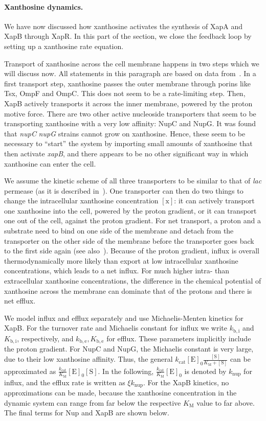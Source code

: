 \documentclass[10pt,letterpaper]{article}
\newcommand{\n}[1]{\mathrm{#1}}
\begin{document}
\paragraph*{Xanthosine dynamics.}
We have now discussed how xanthosine activates the synthesis of XapA and
XapB through XapR. In this part of the section, we close the feedback loop
by setting up a xanthosine rate equation. 

Transport of xanthosine across the cell membrane happens in two steps which
we will discuss now. All statements in this paragraph are based on data
from~\cite{Norholm2001}. In a first transport step, xanthosine passes the
outer membrane through porins like Tsx, OmpF and OmpC. This does not seem to
be a rate-limiting step. Then, XapB actively transports it across the inner
membrane, powered by the proton motive force. There are two other active
nucleoside transporters that seem to be transporting xanthosine with a very
low affinity: NupC and NupG. It was found that \textDelta\emph{nupC}
\textDelta\emph{nupG} strains cannot grow on xanthosine. Hence, these seem
to be necessary to ``start'' the system by importing small amounts of
xanthosine that then activate \emph{xapB}, and there appears to be no other
significant way in which xanthosine can enter the cell.

We assume the kinetic scheme of all three transporters to be similar to that
of \emph{lac} permease (as it is described in~\cite{Kaback2015}). One
transporter can then do two things to change the intracellular xanthosine
concentration $\n{[x]}$: it can actively transport one xanthosine into the
cell, powered by the proton gradient, or it can transport one out of the
cell, against the proton gradient. For net transport, a proton and a
substrate need to bind on one side of the membrane and detach from the
transporter on the other side of the membrane before the transporter goes
back to the first side again (see also~). Because of the
proton gradient, influx is overall thermodynamically more likely than export
at low intracellular xanthosine concentrations, which leads to a net influx.
For much higher intra- than extracellular xanthosine concentrations, the
difference in the chemical potential of xanthosine across the membrane can
dominate that of the protons and there is net efflux. 

We model influx and efflux separately and use Michaelis-Menten kinetics for
XapB. For the turnover rate and Michaelis constant for influx we write
$k_{\n{b, i}}$ and $K_{\n{b, i}}$, respectively, and $k_{\n{b, e}}, K_{\n{b,
e}}$ for efflux. These parameters implicitly include the proton gradient.
For NupC and NupG, the Michaelis constant is very large, due to their low
xanthosine affinity. Thus, the general $k_{\n{cat}} \n{[E]_0}
\frac{\n{[S]}}{K_{\n{M}} + \n{[S]}}$ can be approximated as
$\frac{k_{\n{cat}}}{K_{\n{M}}} \n{[E]_0} \n{[S]}$. In the following,
$\frac{k_{\n{cat}}}{K_{\n{M}}} \n{[E]_0}$ is denoted by $k_{\n{nup}}$ for
influx, and the efflux rate is written as $\xi k_{\n{nup}}$. For the XapB
kinetics, no approximations can be made, because the xanthosine
concentration in the dynamic system can range from far below the respective
$K_{\n{M}}$ value to far above. The final terms for Nup and XapB are shown
below.
\end{document}
